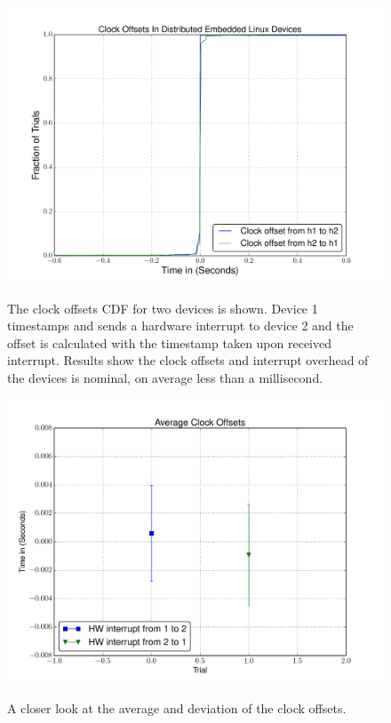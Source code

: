 \begin{figure}[H]
  \includegraphics[scale=0.25]{clock_offset_cdf.pdf}
  \label{sim-err}

  \caption{The clock offsets CDF for two devices is shown. Device 1 timestamps and sends a hardware interrupt to device 2 and the offset is calculated with the timestamp taken upon received interrupt. Results show the clock offsets and interrupt overhead of the devices is nominal, on average less than a millisecond.
    }
\end{figure}

\begin{figure}[H]
  \includegraphics[scale=0.25]{clock_offset_avg.pdf}
  \label{sim-err}

  \caption{A closer look at the average and deviation of the clock offsets.
    }
\end{figure}


